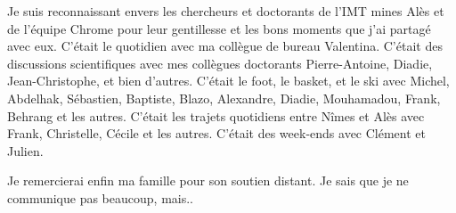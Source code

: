 Je suis reconnaissant envers les chercheurs et doctorants de l'IMT mines Alès et de l'équipe Chrome pour leur gentillesse et les bons moments que j'ai partagé avec eux. C'était le quotidien avec ma collègue de bureau Valentina. C'était des discussions scientifiques avec mes collègues doctorants Pierre-Antoine, Diadie, Jean-Christophe, et bien d'autres. C'était le foot, le basket, et le ski avec Michel, Abdelhak, Sébastien, Baptiste, Blazo, Alexandre, Diadie, Mouhamadou, Frank, Behrang et les autres. C'était les trajets quotidiens entre Nîmes et Alès avec Frank, Christelle, Cécile et les autres. C'était des week-ends avec Clément et Julien.

Je remercierai enfin ma famille pour son soutien distant. Je sais que je ne communique pas beaucoup, mais..